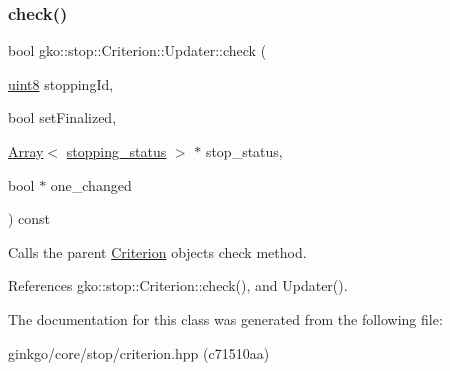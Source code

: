 \subsubsection{\texorpdfstring{check()}{check()}}
{\footnotesize\ttfamily bool gko\+::stop\+::\+Criterion\+::\+Updater\+::check (\begin{DoxyParamCaption}\item[{\hyperlink{namespacegko_a3950fc3732811a8563484e5098c31531}{uint8}}]{stopping\+Id,  }\item[{bool}]{set\+Finalized,  }\item[{\hyperlink{classgko_1_1Array}{Array}$<$ \hyperlink{classgko_1_1stopping__status}{stopping\+\_\+status} $>$ $\ast$}]{stop\+\_\+status,  }\item[{bool $\ast$}]{one\+\_\+changed }\end{DoxyParamCaption}) const\hspace{0.3cm}{\ttfamily [inline]}}



Calls the parent \hyperlink{classgko_1_1stop_1_1Criterion}{Criterion} object\textquotesingle{}s check method. 



References gko\+::stop\+::\+Criterion\+::check(), and Updater().



The documentation for this class was generated from the following file\+:\begin{DoxyCompactItemize}
\item 
ginkgo/core/stop/criterion.\+hpp (c71510aa)\end{DoxyCompactItemize}
